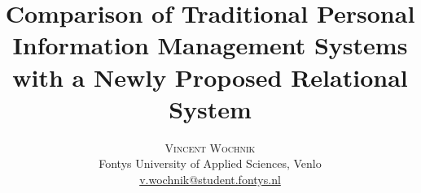 \documentclass[twoside]{article}
\title{\vspace{-15mm}\fontsize{14pt}{10pt}\selectfont\textbf{Comparison of Traditional Personal Information Management Systems with a Newly Proposed Relational System}}
\author{
\large
\textsc{Vincent Wochnik}\\[2mm]
\normalsize Fontys University of Applied Sciences, Venlo \\
\normalsize \href{mailto:v.wochnik@student.fontys.nl}{v.wochnik@student.fontys.nl}
\vspace{-5mm}
}
\date{}
\begin{document}
\maketitle


\begin{multicols}{2}







\begin{thebibliography}{99}

\end{thebibliography}
\end{multicols}
\end{document}

